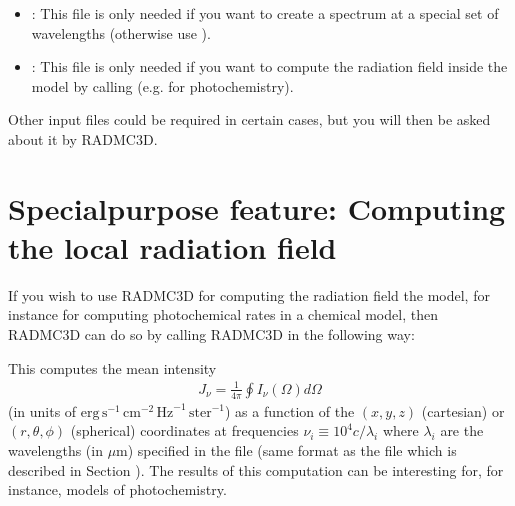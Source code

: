 \documentclass[letterpaper,10pt,english]{sphinxmanual}
\begin{document}
\begin{itemize}
\item {} 
: This file is only needed if you
want to create a spectrum at a special set of wavelengths (otherwise use
).

\item {} 
: This file is only needed if you
want to compute the radiation field inside the model by calling  (e.g. for photochemistry).

\end{itemize}

Other input files could be required in certain cases, but you will then
be asked about it by RADMC\sphinxhyphen{}3D.


\section{Special\sphinxhyphen{}purpose feature: Computing the local radiation field}
\label{\detokenize{dustradtrans:special-purpose-feature-computing-the-local-radiation-field}}\label{\detokenize{dustradtrans:sec-dust-monochromatic-monte-carlo}}
If you wish to use RADMC\sphinxhyphen{}3D for computing the radiation field 
the model, for instance for computing photochemical rates in a chemical model,
then RADMC\sphinxhyphen{}3D can do so by calling RADMC\sphinxhyphen{}3D in the following way:

\begin{sphinxVerbatim}[commandchars=\\\{\}]
 
\end{sphinxVerbatim}

This computes the mean intensity
\begin{equation*}
\begin{split}J_\nu = \frac{1}{4\pi}\oint I_\nu(\Omega)d\Omega\end{split}
\end{equation*}
(in units of
\(\mathrm{erg}\,\mathrm{s}^{-1}\,\mathrm{cm}^{-2}\,\mathrm{Hz}^{-1}\,\mathrm{ster}^{-1}\))
as a function of the \((x,y,z)\) (cartesian) or \((r,\theta,\phi)\)
(spherical) coordinates at frequencies \(\nu_i\equiv 10^4c/\lambda_i\) where
\(\lambda_i\) are the wavelengths (in \(\mu\)m) specified in the file  (same format as the file
 which is described in Section
{\hyperref[\detokenize{inputoutputfiles:sec-wavelengths}]{}}). The results of this computation can be interesting for,
for instance, models of photochemistry.
\end{document}
